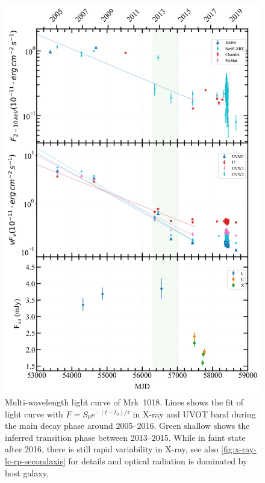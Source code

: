 \documentclass[twocolumn]{aastex63}
\begin{document}
\begin{figure}
\centering
	\includegraphics[width=\textwidth]{./pic/subplots-xrt_uvot-radio-second.png}
    \caption{Multi-wavelength light curve of Mrk~1018. Lines shows the fit of light curve with $F=S_0 e^{-(t-t_0)/\tau }$ in X-ray and UVOT band during the main decay phase around 2005--2016. Green shallow shows the inferred transition phase between 2013--2015.  While in faint state after 2016, there is still rapid variability in X-ray, see also \autoref{fig:x-ray-lc-rp-secondaxis} for details and optical radiation is dominated by host galaxy.}
    \label{fig:multi-lc-secondaxis}
\end{figure}
\end{document}
